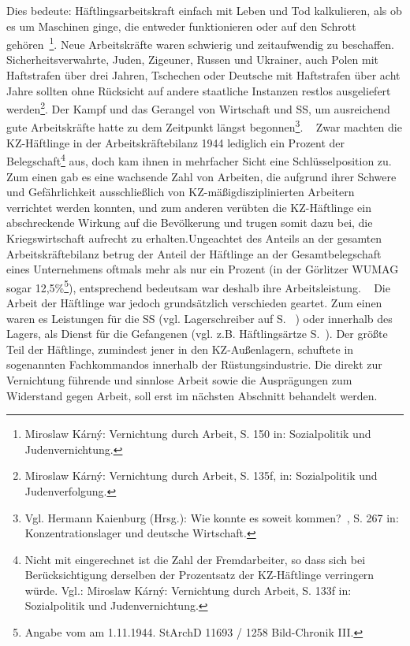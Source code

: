 \documentclass[a4paper,12pt,ngerman,
]{nisebook}
\begin{document}
Dies bedeute: \glqq Häftlingsarbeitskraft einfach mit Leben und Tod kalkulieren, als ob es um Maschinen ginge, die entweder funktionieren oder auf den Schrott gehören\grqq~\footnote{Miroslaw K\'arn\'y: \glqq Vernichtung durch Arbeit\grqq, S. 150 in: Sozialpolitik und Judenvernichtung.}. Neue Arbeitskräfte waren schwierig und zeitaufwendig zu beschaffen. Sicherheitsverwahrte, Juden, Zigeuner, Russen und Ukrainer, auch Polen mit Haftstrafen über drei Jahren, Tschechen oder Deutsche mit Haftstrafen über acht Jahre sollten ohne Rücksicht auf andere staatliche Instanzen restlos ausgeliefert werden\footnote{Miroslaw K\'arn\'y: \glqq Vernichtung durch Arbeit\grqq, S. 135f, in: Sozialpolitik und Judenverfolgung.}. Der Kampf und das Gerangel von Wirtschaft und SS, um ausreichend gute Arbeitskräfte hatte zu dem Zeitpunkt längst begonnen\footnote{Vgl. Hermann Kaienburg (Hrsg.): \glqq Wie konnte es soweit kommen?\grqq~, S. 267 in: Konzentrationslager und deutsche Wirtschaft.}.
~\newline
Zwar machten die KZ-Häftlinge in der Arbeitskräftebilanz 1944 lediglich ein Prozent der Belegschaft\footnote{Nicht mit eingerechnet ist die Zahl der Fremdarbeiter, so dass sich bei Berücksichtigung derselben der Prozentsatz der KZ-Häftlinge verringern würde. Vgl.: Miroslaw K\'arn\'y: \glqq Vernichtung durch Arbeit\grqq, S. 133f in: Sozialpolitik und Judenvernichtung.} aus, doch kam ihnen in mehrfacher Sicht eine Schlüsselposition zu. Zum einen gab es eine wachsende Zahl von Arbeiten, die aufgrund ihrer Schwere und Gefährlichkeit ausschließlich von \glqq KZ-mäßig\grqq disziplinierten Arbeitern verrichtet werden konnten, und zum anderen verübten die KZ-Häftlinge ein abschreckende Wirkung auf die Bevölkerung und trugen somit dazu bei, die Kriegswirtschaft aufrecht zu erhalten.\newline Ungeachtet des Anteils an der gesamten Arbeitskräftebilanz betrug der Anteil der Häftlinge an der Gesamtbelegschaft eines Unternehmens oftmals mehr als nur ein Prozent (in der Görlitzer WUMAG sogar 12,5\%\footnote{Angabe vom am 1.11.1944. StArchD 11693 / 1258 Bild-Chronik III.}), entsprechend bedeutsam war deshalb ihre Arbeitsleistung.
~\newline
Die Arbeit der Häftlinge war jedoch grundsätzlich verschieden geartet. Zum einen waren es Leistungen für die SS (vgl. Lagerschreiber auf S. ~\pageref{schreiber}) oder innerhalb des Lagers, als Dienst für die Gefangenen (vgl. z.B. Häftlingsärtze S.~\pageref{arzt}). Der größte Teil der Häftlinge, zumindest jener in den KZ-Außenlagern, schuftete in sogenannten Fachkommandos innerhalb der Rüstungsindustrie. Die direkt zur Vernichtung führende und sinnlose Arbeit sowie die Ausprägungen zum Widerstand gegen Arbeit, soll erst im nächsten Abschnitt behandelt werden.
\end{document}
